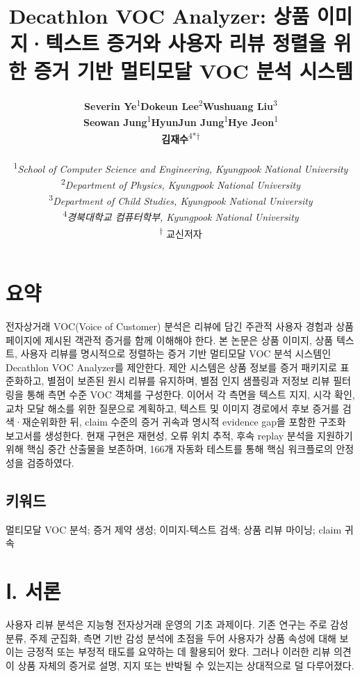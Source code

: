 \documentclass[11pt]{article}
\title{\textbf{Decathlon VOC Analyzer: 상품 이미지·텍스트 증거와 사용자 리뷰 정렬을 위한 증거 기반 멀티모달 VOC 분석 시스템}}
\author{{\small
\begin{tabular}{@{}ccc@{}}
\parbox[t]{0.3067\textwidth}{\centering \textbf{Severin Ye}\textsuperscript{1}} & \parbox[t]{0.3067\textwidth}{\centering \textbf{Dokeun Lee}\textsuperscript{2}} & \parbox[t]{0.3067\textwidth}{\centering \textbf{Wushuang Liu}\textsuperscript{3}} \\[0.9em]
\parbox[t]{0.3067\textwidth}{\centering \textbf{Seowan Jung}\textsuperscript{1}} & \parbox[t]{0.3067\textwidth}{\centering \textbf{HyunJun Jung}\textsuperscript{1}} & \parbox[t]{0.3067\textwidth}{\centering \textbf{Hye Jeon}\textsuperscript{1}} \\[0.9em]
\parbox[t]{0.3067\textwidth}{} & \parbox[t]{0.3067\textwidth}{\centering \textbf{김재수}\textsuperscript{4*†}} & \parbox[t]{0.3067\textwidth}{} \\
\multicolumn{3}{c}{} \\[0.45em]
\multicolumn{3}{c}{\parbox{0.9200\textwidth}{\centering\small\textsuperscript{1}\textit{School of Computer Science and Engineering, Kyungpook National University}}} \\
\multicolumn{3}{c}{\parbox{0.9200\textwidth}{\centering\small\textsuperscript{2}\textit{Department of Physics, Kyungpook National University}}} \\
\multicolumn{3}{c}{\parbox{0.9200\textwidth}{\centering\small\textsuperscript{3}\textit{Department of Child Studies, Kyungpook National University}}} \\
\multicolumn{3}{c}{\parbox{0.9200\textwidth}{\centering\small\textsuperscript{4}\textit{경북대학교 컴퓨터학부, Kyungpook National University}}} \\
\multicolumn{3}{c}{\small \textsuperscript{†} 교신저자} \\
\end{tabular}
}}
\date{} %
\begin{document}
\maketitle
\nocite{lewis2020retrievalAugmentedGeneration,gao2023rarr,radford2021clip,liu2024structuredOutputBenchmark,geng2023grammarConstrainedDecoding,yao2023react,nvidia2024multimodalRagIntro,nvidia2024aiReadyKnowledgeSystems,faysse2024colpali,pontiki2014semevalAspect,qdrant2024pdfRetrievalAtScale,qdrant2024multiVectorCourse,manning2008introductionIr}

\section{요약}
전자상거래 VOC(Voice of Customer) 분석은 리뷰에 담긴 주관적 사용자 경험과 상품 페이지에 제시된 객관적 증거를 함께 이해해야 한다. 본 논문은 상품 이미지, 상품 텍스트, 사용자 리뷰를 명시적으로 정렬하는 증거 기반 멀티모달 VOC 분석 시스템인 Decathlon VOC Analyzer를 제안한다. 제안 시스템은 상품 정보를 증거 패키지로 표준화하고, 별점이 보존된 원시 리뷰를 유지하며, 별점 인지 샘플링과 저정보 리뷰 필터링을 통해 측면 수준 VOC 객체를 구성한다. 이어서 각 측면을 텍스트 지지, 시각 확인, 교차 모달 해소를 위한 질문으로 계획하고, 텍스트 및 이미지 경로에서 후보 증거를 검색·재순위화한 뒤, claim 수준의 증거 귀속과 명시적 evidence gap을 포함한 구조화 보고서를 생성한다. 현재 구현은 재현성, 오류 위치 추적, 후속 replay 분석을 지원하기 위해 핵심 중간 산출물을 보존하며, 166개 자동화 테스트를 통해 핵심 워크플로의 안정성을 검증하였다.

\subsection{키워드}

멀티모달 VOC 분석; 증거 제약 생성; 이미지-텍스트 검색; 상품 리뷰 마이닝; claim 귀속

\section{Ⅰ. 서론}
사용자 리뷰 분석은 지능형 전자상거래 운영의 기초 과제이다. 기존 연구는 주로 감성 분류, 주제 군집화, 측면 기반 감성 분석에 초점을 두어 사용자가 상품 속성에 대해 보이는 긍정적 또는 부정적 태도를 요약하는 데 활용되어 왔다. 그러나 이러한 리뷰 의견이 상품 자체의 증거로 설명, 지지 또는 반박될 수 있는지는 상대적으로 덜 다루어졌다.
\end{document}
